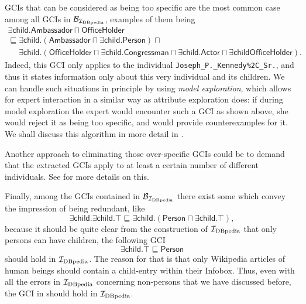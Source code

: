 GCIs that can be considered as being too specific are the most common case among all GCIs
in $\mathcal{B}_{{\mathcal{I}_{\text{DBpedia}}}}$, examples of them being
\begin{gather*}
  \mathsf{\exists child. Ambassador \sqcap OfficeHolder} \\
  \sqsubseteq \mathsf{\exists child. (Ambassador \sqcap \exists child. Person) \sqcap {}}\\
  \phantom{\sqsubseteq{}} \mathsf{\exists child. (OfficeHolder \sqcap \exists child.
  Congressman \sqcap \exists child. Actor \sqcap \exists child OfficeHolder)}.
\end{gather*}
Indeed, this GCI only applies to the individual \texttt{Joseph\_P.\_Kennedy\%2C\_Sr.}, and
thus it states information only about this very individual and its children.  We can
handle such situations in principle by using \emph{model exploration}, which allows for
expert interaction in a similar way as attribute exploration does: if during model
exploration the expert would encounter such a GCI as shown above, she would reject it as
being too specific, and would provide counterexamples for it.  We shall discuss this
algorithm in more detail in .

Another approach to eliminating those over-specific GCIs could be to demand that the
extracted GCIs apply to at least a certain number of different individuals.  See
 for more details on this.

Finally, among the GCIs contained in $\mathcal{B}_{\mathcal{I}_{\text{DBpedia}}}$ there exist some which convey
the impression of being redundant, like
\begin{equation*}
  \mathsf{\exists child. \exists child. \top \sqsubseteq \exists child. (Person \sqcap \exists child. \top)},
\end{equation*}
because it should be quite clear from the construction of ${\mathcal{I}_{\text{DBpedia}}}$ that only persons
can have children, \ie the following GCI
\begin{equation}
  \label{eq:23}
  \mathsf{\exists child. \top \sqsubseteq Person}
\end{equation}
should hold in ${\mathcal{I}_{\text{DBpedia}}}$.  The reason for that is that only Wikipedia articles of human
beings should contain a child-entry within their Infobox.  Thus, even with all the errors
in ${\mathcal{I}_{\text{DBpedia}}}$ concerning non-persons that we have discussed before, the GCI in
 should hold in ${\mathcal{I}_{\text{DBpedia}}}$.


